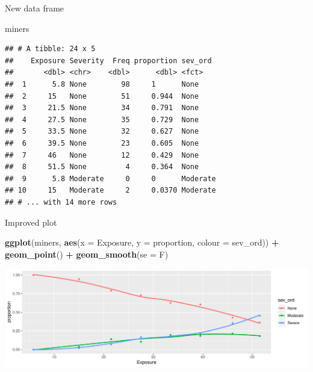 \documentclass[
  ignorenonframetext,
]{beamer}
\newenvironment{Shaded}{\begin{snugshade}}{\end{snugshade}}
\newcommand{\DataTypeTok}[1]{\textcolor[rgb]{0.13,0.29,0.53}{#1}}
\newcommand{\KeywordTok}[1]{\textcolor[rgb]{0.13,0.29,0.53}{\textbf{#1}}}
\newcommand{\NormalTok}[1]{#1}
\newcommand{\OperatorTok}[1]{\textcolor[rgb]{0.81,0.36,0.00}{\textbf{#1}}}
\newcommand{\StringTok}[1]{\textcolor[rgb]{0.31,0.60,0.02}{#1}}
\begin{document}
\begin{frame}[fragile]{New data frame}
\protect\hypertarget{new-data-frame}{}

\small

\begin{Shaded}
\begin{Highlighting}[]
\NormalTok{miners}
\end{Highlighting}
\end{Shaded}

\begin{verbatim}
## # A tibble: 24 x 5
##    Exposure Severity  Freq proportion sev_ord 
##       <dbl> <chr>    <dbl>      <dbl> <fct>   
##  1      5.8 None        98     1      None    
##  2     15   None        51     0.944  None    
##  3     21.5 None        34     0.791  None    
##  4     27.5 None        35     0.729  None    
##  5     33.5 None        32     0.627  None    
##  6     39.5 None        23     0.605  None    
##  7     46   None        12     0.429  None    
##  8     51.5 None         4     0.364  None    
##  9      5.8 Moderate     0     0      Moderate
## 10     15   Moderate     2     0.0370 Moderate
## # ... with 14 more rows
\end{verbatim}

\normalsize

\end{frame}

\begin{frame}[fragile]{Improved plot}
\protect\hypertarget{improved-plot}{}

\begin{Shaded}
\begin{Highlighting}[]
\KeywordTok{ggplot}\NormalTok{(miners, }\KeywordTok{aes}\NormalTok{(}\DataTypeTok{x =}\NormalTok{ Exposure, }\DataTypeTok{y =}\NormalTok{ proportion,}
                   \DataTypeTok{colour =}\NormalTok{ sev_ord)) }\OperatorTok{+}\StringTok{ }
\StringTok{  }\KeywordTok{geom_point}\NormalTok{() }\OperatorTok{+}\StringTok{ }\KeywordTok{geom_smooth}\NormalTok{(}\DataTypeTok{se =}\NormalTok{ F)}
\end{Highlighting}
\end{Shaded}

\includegraphics{slides_d29_files/figure-beamer/unnamed-chunk-114-1.pdf}

\end{frame}
\end{document}
